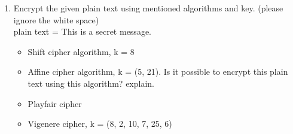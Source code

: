 \documentclass[12pt,oneside,oldfontcommands]{memoir}
\begin{document}
  \begin{enumerate}[label=(\alph*)]
    \item Encrypt the given plain text using mentioned algorithms and key. (please ignore the white space)\\
    plain text = This is a secret message.
    \begin{itemize}
        \item Shift cipher algorithm, k = 8
        \item Affine cipher algorithm, k = (5, 21). Is it possible to encrypt this plain text using this algorithm? explain.
        \item Playfair cipher
        \item Vigenere cipher, k = (8, 2, 10, 7, 25, 6)
    \end{itemize}
    
  \end{enumerate}
\end{document}

